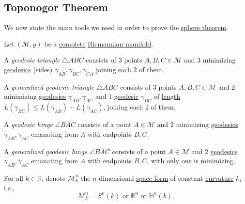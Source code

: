 \subsection{Toponogor Theorem}
We now state the main tools we need in order to prove the \hyperref[thm:sphere]{sphere theorem}.

\begin{definition*}
	Let \((\mathcal{M} , g)\) be a \hyperref[def:geodesically-complete]{complete} \hyperref[def:Riemannian-manifold]{Riemannian manifold}.
	\begin{definition}\label{def:geodesic-triangle}
		A \emph{geodesic triangle} \(\triangle ABC\) consists of \(3\) points \(A, B, C\in \mathcal{M} \) and \(3\) minimizing \hyperref[def:geodesic]{geodesics} (sides) \(\gamma _{AB}, \gamma _{BC}, \gamma _{CA}\) joining each \(2\) of them.
	\end{definition}

	\begin{definition}\label{def:generalized-geodesic-triangle}
		A \emph{generalized geodesic triangle} \(\triangle ABC\) consists of \(3\) points \(A, B, C\in \mathcal{M} \) and \(2\) minimizing \hyperref[def:geodesic]{geodesics} \(\gamma _{AB}, \gamma _{AC}\) and \(1\) \hyperref[def:geodesic]{geodesic} \(\gamma _{BC}\) of \hyperref[def:length]{length} \(L(\gamma _{BC}) \leq L(\gamma _{AB}) + L(\gamma _{AC})\), joining each \(2\) of them.
	\end{definition}

	\begin{definition}\label{def:geodesic-hinge}
		A \emph{geodesic hinge} \(\angle BAC\) consists of a point \(A\in \mathcal{M} \) and \(2\) minimizing \hyperref[def:geodesic]{geodesics} \(\gamma _{AB}, \gamma _{AC}\) emanating from \(A\) with endpoints \(B, C\).
	\end{definition}
	\begin{definition}\label{def:generalized-geodesic-hinge}
		A \emph{generalized geodesic hinge} \(\angle BAC\) consists of a point \(A\in \mathcal{M} \) and \(2\) \hyperref[def:geodesic]{geodesics} \(\gamma _{AB}, \gamma _{AC}\) emanating from \(A\) with endpoints \(B, C\), with only one is minimizing.
	\end{definition}
\end{definition*}

For all \(k\in \mathbb{R} \), denote \(\mathcal{M} _k^n\) the \(n\)-dimensional \hyperref[def:space-form]{space form} of constant \hyperref[def:sectional-curvature]{curvature} \(k\), i.e.,
\[
	\mathcal{M} _k^n = S^n(k) \text{ or } \mathbb{R} ^n \text{ or } \mathbb{H} ^n(k).
\]

